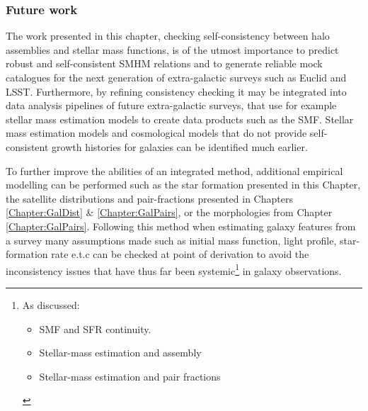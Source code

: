 \subsubsection{Future work}
The work presented in this chapter, checking self-consistency between \LCDM halo assemblies and stellar mass functions, is of the utmost importance to predict robust and self-consistent SMHM relations and to generate reliable mock catalogues for the next generation of extra-galactic surveys such as Euclid and LSST. Furthermore, by refining consistency checking it may be integrated into data analysis pipelines of future extra-galactic surveys, that use for example stellar mass estimation models to create data products such as the SMF. Stellar mass estimation models and cosmological models that do not provide self-consistent growth histories for galaxies can be identified much earlier. 

To further improve the abilities of an integrated method, additional empirical modelling can be performed such as the star formation presented in this Chapter, the satellite distributions and pair-fractions presented in Chapters \ref{Chapter:GalDist} \& \ref{Chapter:GalPairs}, or the morphologies from Chapter \ref{Chapter:GalPairs}. Following this method when estimating galaxy features from a survey many assumptions made such as initial mass function, light profile, star-formation rate e.t.c can be checked at point of derivation to avoid the inconsistency issues that have thus far been systemic\footnote{As discussed: \begin{itemize}
    \item SMF and SFR continuity.
    \item Stellar-mass estimation and \LCDM assembly
    \item Stellar-mass estimation and pair fractions
\end{itemize}} in galaxy observations. 
